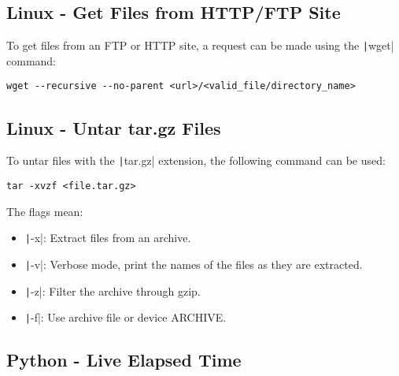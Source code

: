 \newpage
\subsection{Linux - Get Files from HTTP/FTP Site}

To get files from an FTP or HTTP site, a request can be made using the \texttt|wget|
command:
\begin{verbatim}
wget --recursive --no-parent <url>/<valid_file/directory_name>
\end{verbatim}


\subsection{Linux - Untar tar.gz Files}

To untar files with the \texttt|tar.gz| extension, the following command can be used:
\begin{verbatim}
tar -xvzf <file.tar.gz>
\end{verbatim}
The flags mean:
\begin{itemize}
    \item \texttt|-x|: Extract files from an archive.
    \item \texttt|-v|: Verbose mode, print the names of the files as they are extracted.
    \item \texttt|-z|: Filter the archive through gzip.
    \item \texttt|-f|: Use archive file or device ARCHIVE.
\end{itemize}


\newpage
\subsection{Python - Live Elapsed Time}

